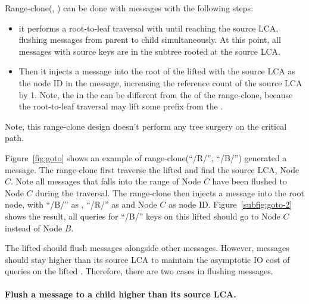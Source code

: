 Range-clone(\spre, \dpre) can be done with \goto messages with the following
steps:
\begin{itemize}
\item it performs a root-to-leaf traversal with \spre until reaching the source
LCA, flushing messages from parent to child simultaneously.
At this point, all messages with source keys are in the subtree rooted at the
source LCA.
\item Then it injects a \goto message into the root of the lifted \bedag with
the source LCA as the node ID in the \goto message, increasing the reference
count of the source LCA by 1.
Note, the \spre in the \goto can be different from the \spre of the range-clone,
because the root-to-leaf traversal may lift some prefix from the \spre.
\end{itemize}
Note, this range-clone design doesn't perform any tree surgery on the critical
path.

Figure~\ref{fig:goto} shows an example of range-clone(``/R/'', ``/B/'')
generated a \goto message.
The range-clone first traverse the lifted \bedag and find the source LCA, Node
$C$.
Note all messages that falls into the range of Node $C$ have been flushed to
Node $C$ during the traversal.
The range-clone then injects a \goto message into the root node, with ``/B/''
as \dpre, ``/R/'' as \spre and Node $C$ as node ID.
Figure~\ref{subfig:goto-2} shows the result, all queries for ``/B/'' keys on
this lifted \bedag should go to Node $C$ instead of Node $B$.

The lifted \bedag should flush \goto messages alongside other messages.
However, \goto messages should stay higher than its source LCA to maintain the
asymptotic IO cost of queries on the lifted \bedag.
Therefore, there are two cases in flushing \goto messages.

\paragraph{Flush a \goto message to a child higher than its source LCA.}

